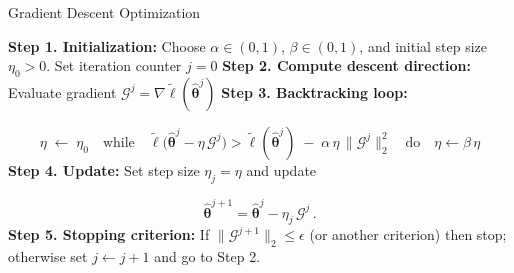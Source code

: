 \begin{frame}{Gradient Descent Optimization}
    
\begin{center}
\begin{minipage}{0.95\textwidth}
\LinesNotNumbered
\begin{algorithm}[H]
\label{algorithm_1}
\SetAlgoLined
\caption{Armijo Backtracking Line Search + Gradient Descent}
\textbf{Step 1. Initialization:} Choose $\alpha\in(0,1)$, $\beta\in(0,1)$, and initial step size $\eta_{0} > 0$. Set iteration counter $j=0$\;
\textbf{Step 2. Compute descent direction:} Evaluate gradient $\mathscr{G}^j = \nabla \tilde\ell(\hat{\bm\theta}^j)$\;
\textbf{Step 3. Backtracking loop:}

$$\eta \;\leftarrow\;\eta_{0}
    \quad\text{while}\quad
    \tilde\ell\bigl(\hat{\bm\theta}^j - \eta\,\mathscr{G}^j\bigr)
    >
    \tilde\ell(\hat{\bm\theta}^j)
    \;-\;\alpha\,\eta\,\|\mathscr{G}^j\|_2^2
    \quad\text{do}\quad
    \eta \leftarrow \beta\,\eta$$
\textbf{Step 4. Update:} Set step size $\eta_j = \eta$ and update

$$\hat{\bm\theta}^{j+1} = \hat{\bm\theta}^j - \eta_j\,\mathscr{G}^j\,.$$
\textbf{Step 5. Stopping criterion:} If $\|\mathscr{G}^{j+1}\|_2\le\epsilon$ (or another criterion) then stop; otherwise set $j\leftarrow j+1$ and go to Step 2.
\end{algorithm}
\end{minipage}
\end{center}

\end{frame}


